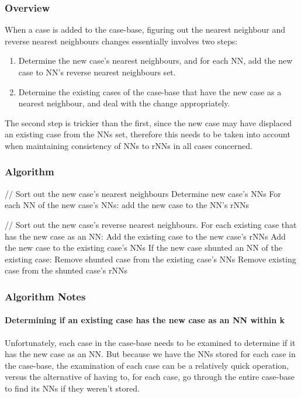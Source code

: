 \documentclass[a4paper,11pt]{report}
\begin{document}
\subsubsection{Overview}
When a case is added to the case-base, figuring out the nearest neighbour and reverse nearest neighbours changes essentially involves two steps:
\begin{enumerate}
	\item Determine the new case's nearest neighbours, and for each NN, add the new case to NN's reverse nearest neighbours set.
	\item Determine the existing cases of the case-base that have the new case as a nearest neighbour, and deal with the change appropriately.
\end{enumerate}

The second step is trickier than the first, since the new case may have displaced an existing case from the NNs set, therefore this needs to be taken into account when maintaining consistency of NNs to rNNs in all cases concerned.

\subsubsection{Algorithm\label{sec:nnchangesalg}}
\begin{code}
// Sort out the new case's nearest neighbours
Determine new case's NNs
For each NN of the new case's NNs:
  add the new case to the NN's rNNs

// Sort out the new case's reverse nearest neighbours.
For each existing case that has the new case as an NN:
  Add the existing case to the new case's rNNs
  Add the new case to the existing case's NNs
  If the new case shunted an NN of the existing case:
    Remove shunted case from the existing case's NNs
    Remove existing case from the shunted case's rNNs
\end{code}

\subsubsection{Algorithm Notes}
\paragraph{Determining if an existing case has the new case as an NN within k}
Unfortunately, each case in the case-base needs to be examined to determine if it has the new case as an NN. But because we have the NNs stored for each case in the case-base, the examination of each case can be a relatively quick operation, versus the alternative of having to, for each case, go through the entire case-base to find its NNs if they weren't stored.
\end{document}
